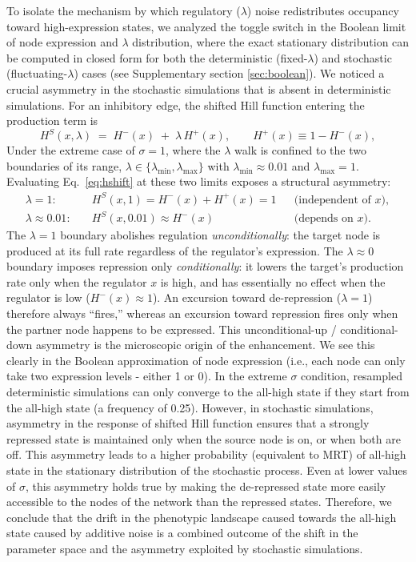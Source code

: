 \documentclass[11pt]{article}
\begin{document}
To isolate the mechanism by which regulatory ($\lambda$) noise redistributes occupancy toward high-expression states, we analyzed the toggle switch in the Boolean limit of node expression and $\lambda$ distribution, where the exact stationary distribution can be computed in closed form for both the deterministic (fixed-$\lambda$) and stochastic (fluctuating-$\lambda$) cases (see Supplementary section \ref{sec:boolean}). We noticed a crucial asymmetry in the stochastic simulations that is absent in deterministic simulations. For an inhibitory edge, the shifted Hill function entering the production term is
\begin{equation}
  H^{S}(x,\lambda) \;=\; H^{-}(x) \;+\; \lambda\,H^{+}(x),
  \qquad H^{+}(x) \equiv 1 - H^{-}(x),
  \label{eq:hshift}
\end{equation}
Under the extreme case of $\sigma=1$, where the $\lambda$ walk is confined to the two boundaries of its range, $\lambda\in\{\lambda_{\min},\lambda_{\max}\}$ with $\lambda_{\min}\approx 0.01$ and $\lambda_{\max}=1$. Evaluating Eq.~\eqref{eq:hshift} at these two limits exposes a structural asymmetry:
\begin{align}
  \lambda = 1: \quad & H^{S}(x,1) = H^{-}(x)+H^{+}(x) = 1
    && \text{(independent of } x\text{)},\\
  \lambda \approx 0.01: \quad & H^{S}(x,0.01) \approx H^{-}(x)
    && \text{(depends on } x\text{)}.
\end{align}
The $\lambda=1$ boundary abolishes regulation \emph{unconditionally}: the target node is produced at its full rate regardless of the regulator's expression. The $\lambda\approx 0$ boundary imposes repression only \emph{conditionally}: it lowers the target's production rate only when the regulator $x$ is high, and has essentially no effect when the regulator is low ($H^{-}(x)\!\approx\!1$). An excursion toward de-repression ($\lambda=1$) therefore always ``fires,'' whereas an excursion toward repression fires only when the partner node happens to be expressed. This unconditional-up / conditional-down asymmetry is the microscopic origin of the enhancement. We see this clearly in the Boolean approximation of node expression (i.e., each node can only take two expression levels - either 1 or 0). In the extreme $\sigma$ condition, resampled deterministic simulations can only converge to the all-high state if they start from the all-high state (a frequency of 0.25). However, in stochastic simulations, asymmetry in the response of shifted Hill function ensures that a strongly repressed state is maintained only when the source node is on, or when both are off. This asymmetry leads to a higher probability (equivalent to MRT) of all-high state in the stationary distribution of the stochastic process. Even at lower values of $\sigma$, this asymmetry holds true by making the de-repressed state more easily accessible to the nodes of the network than the repressed states. Therefore, we conclude that the drift in the phenotypic landscape caused towards the all-high state caused by additive noise is a combined outcome of the shift in the parameter space and the asymmetry exploited by stochastic simulations. 
\end{document}
